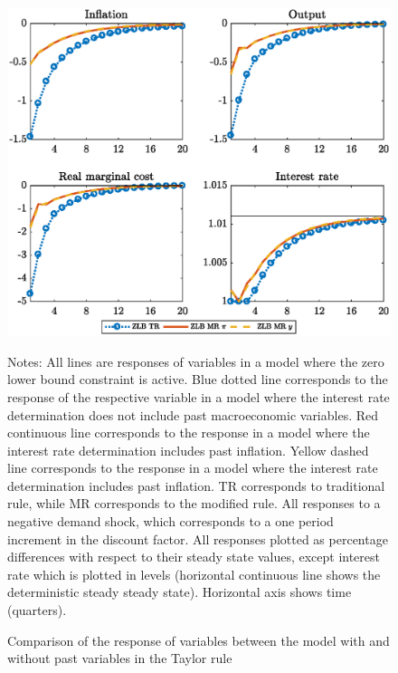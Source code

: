 \documentclass[11pt]{article}
\numberwithin{equation}{section}
\begin{document}
\begin{figure}[H]
	\centering
	\caption{Comparison of the response of variables between the model with and without past variables in the Taylor rule}\label{fig:irfCompLevel_pref}
	\includegraphics[scale=.6]{irfCompLevel_pref}
	\begin{minipage}{\linewidth}
    	\vspace{1mm}
	\footnotesize{{\sc Notes:} All lines are responses of variables in a model where the zero lower bound constraint is active. Blue dotted line corresponds to the response of the respective variable in a model where the interest rate determination does not include past macroeconomic variables. Red continuous line corresponds to the response in a model where the interest rate determination includes past inflation. Yellow dashed line corresponds to the response in a model where the interest rate determination includes past inflation. TR corresponds to traditional rule, while MR corresponds to the modified rule. All responses to a negative demand shock, which corresponds to a one period increment in the discount factor. All responses plotted as percentage differences with respect to their steady state values, except interest rate which is plotted in levels (horizontal continuous line shows the deterministic steady steady state). Horizontal axis shows time (quarters).}
	\end{minipage}
\end{figure}
\end{document}
